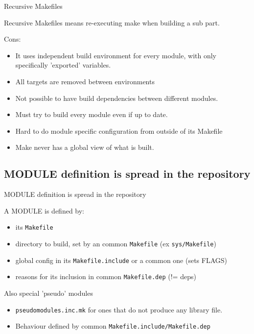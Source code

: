 \documentclass[ucs,9pt]{beamer}
\begin{document}
\begin{frame}{Recursive Makefiles}

  Recursive Makefiles means re-executing make when building a sub part.

  \bigskip
  Cons:

  \begin{itemize}
    \item
      It uses independent build environment for every module, with only specifically 'exported' variables.
    \item
      All targets are removed between environments
    \item
      Not possible to have build dependencies between different modules.
    \item
      Must try to build every module even if up to date.
    \item
      Hard to do module specific configuration from outside of its Makefile
    \item
      Make never has a global view of what is built.
  \end{itemize}

\end{frame}


\subsection{MODULE definition is spread in the repository}

\begin{frame}{MODULE definition is spread in the repository}

  A MODULE is defined by:

  \begin{itemize}
    \item
      its \texttt{Makefile}
    \item
      directory to build, set by an common \texttt{Makefile} (ex \texttt{sys/Makefile})

    \item
      global config in its \texttt{Makefile.include} or a common one (sets FLAGS)

    \item
      reasons for its inclusion in common \texttt{Makefile.dep} (!= deps)

  \end{itemize}

  \pause
  Also special 'pseudo' modules
  \begin{itemize}
    \item
      \texttt{pseudomodules.inc.mk} for ones that do not produce any library file.
    \item
      Behaviour defined by common \texttt{Makefile.include/Makefile.dep}

  \end{itemize}

\end{frame}
\end{document}
